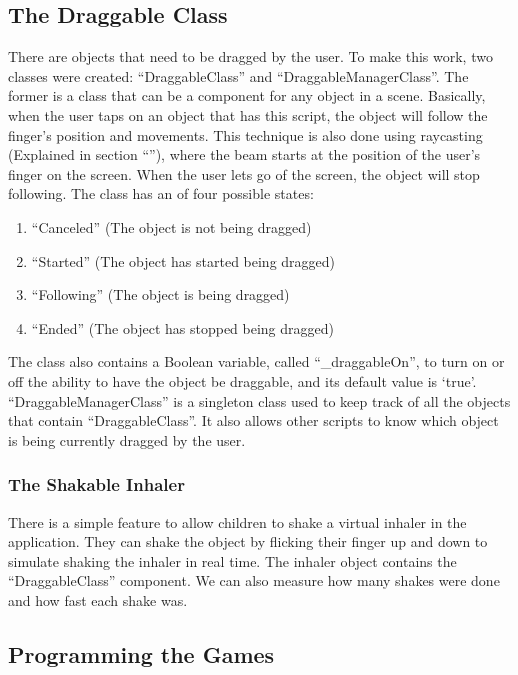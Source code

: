 \subsection*{The Draggable Class}
\label{DraggableClass}
There are objects that need to be dragged by the user. To make this work, two classes were created: “{\codefont DraggableClass}” and “{\codefont DraggableManagerClass}”. The former is a class that can be a component for any object in a scene. Basically, when the user taps on an object that has this script, the object will follow the finger’s position and movements. This technique is also done using raycasting (Explained in section “”), where the beam starts at the position of the user's finger on the screen. When the user lets go of the screen, the object will stop following. The class has an  of four possible states:
\begin{enumerate}

\item{“Canceled” (The object is not being dragged)}
\item{“Started” (The object has started being dragged)}
\item{“Following” (The object is being dragged)}
\item{“Ended” (The object has stopped being dragged)}
\end{enumerate}
The class also contains a Boolean variable, called “{\codefont \_draggableOn}”, to turn on or off the ability to have the object be draggable, and its default value is ‘{\codefont true}’. “{\codefont DraggableManagerClass}” is a singleton class used to keep track of all the objects that contain “{\codefont DraggableClass}”. It also allows other scripts to know which object is being currently dragged by the user.

\subsubsection*{The Shakable Inhaler}
There is a simple feature to allow children to shake a virtual inhaler in the application. They can shake the object by flicking their finger up and down to simulate shaking the inhaler in real time. The inhaler object contains the “{\codefont DraggableClass}” component. We can also measure how many shakes were done and how fast each shake was.


\subsection{Programming the Games}

